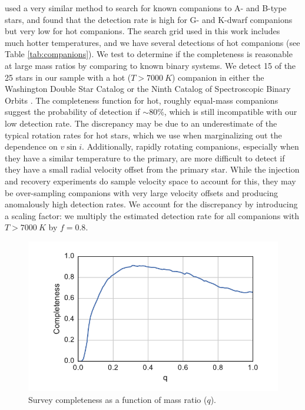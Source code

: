 \documentclass{emulateapj}
\begin{document}
\citet{Gullikson2016} used a very similar method to search for known companions to A- and B-type stars, and found that the detection rate is high for G- and K-dwarf companions but very low for hot companions. The search grid used in this work includes much hotter temperatures, and we have several detections of hot companions (see Table \ref{tab:companions}). We test to determine if the completeness is reasonable at large mass ratios by comparing to known binary systems. We detect 15 of the 25 stars in our sample with a hot ($T > 7000\ K$) companion in either the Washington Double Star Catalog \citep{WDS} or the Ninth Catalog of Spectroscopic Binary Orbits \citep{SB9}. The completeness function for hot, roughly equal-mass companions suggest the probability of detection if $\sim 80\%$, which is still incompatible with our low detection rate. The discrepancy may be due to an underestimate of the typical rotation rates for hot stars, which we use when marginalizing out the dependence on $v\sin{i}$. Additionally, rapidly rotating companions, especially when they have a similar temperature to the primary, are more difficult to detect if they have a small radial velocity offset from the primary star. While the injection and recovery experiments do sample velocity space to account for this, they may be over-sampling companions with very large velocity offsets and producing anomalously high detection rates. We account for the discrepancy by introducing a scaling factor: we multiply the estimated detection rate for all companions with $T > 7000\ K$ by $f=0.8$. 


\begin{figure}
\includegraphics[width=\columnwidth]{SurveyCompleteness.pdf}
\caption{Survey completeness as a function of mass ratio ($q$).}
\label{fig:completeness}
\end{figure}
\end{document}
